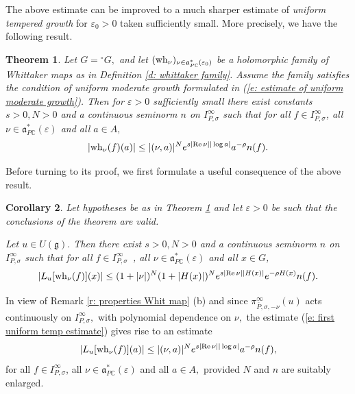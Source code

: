 \documentclass[12pt,a4paper]{article}
\newtheorem{Thm}{Theorem}
\newtheorem{Cor}[Thm]{Corollary}
\newenvironment{thm}[0]{\begin{Thm}\noindent}%
{\end{Thm}}
\newenvironment{cor}[0]{\begin{Cor}\noindent}%
{\end{Cor}}
\def\proof{\par\noindent{\it Proof.}{\ }{\ }}
\def\msy#1{{\mathbb #1}}
\def\C{{\msy C}}
\def\ge{\varepsilon}
\def\gs{\sigma}
\def\got#1{\mathfrak #1}
\def\fa{{\got a}}
\def\fg{{\got g}}
\def\Re{{\rm Re}\,}
\def\iC{{\scriptscriptstyle \C}}
\numberwithin{Thm}{section}
\numberwithin{equation}{section}
\def\faPdc{{\fa_{P\iC}^*}}
\numberwithin{equation}{section}
\def\faPdc{\fa_{P\iC}^*}
\def\snorm{n}
\def\IPgs{I_{P,\gs}^\infty}
\def\wh{{\rm wh}}
\begin{document}
The above estimate can be improved to a much sharper estimate 
of {\em uniform tempered growth} for $\ge_0 > 0$ taken sufficiently small.
More precisely, we have the following result.

\begin{thm}
\label{t: uniformly tempered estimates}
Let $G = {}^\circ G,$ and let $(\wh_\nu)_{\nu \in \faPdc(\ge_0)}$ be a holomorphic family of 
Whittaker maps as in Definition \ref{d: whittaker family}. Assume the family satisfies the condition 
of uniform moderate growth formulated in (\ref{e: estimate of uniform moderate growth}).
Then for $\ge > 0$ sufficiently small there exist constants $s > 0, N >0$ and a continuous seminorm $\snorm$ on $\IPgs$ such that for all $f \in \IPgs$, all $\nu \in \faPdc(\ge)$ and all $a \in A,$ 
\begin{equation}
\label{e: first uniform temp estimate}
|\wh_\nu(f)(a)| \leq  |(\nu,a)|^N e^{s |\Re \nu| |\log a| } a^{-\rho} \snorm(f).
\end{equation} 
\end{thm}

Before turning to its proof,  we first formulate a useful  consequence of the above result.

\begin{cor}
\label{c: uniformly tempered estimates} 
Let hypotheses be as in Theorem \ref{t: uniformly tempered estimates} and let $\ge >0$
be such that the conclusions of the theorem are valid.

Let $u \in U(\fg).$ Then there exist $s > 0, N >0$ and a continuous seminorm 
$\snorm$ on $\IPgs$ such that 
for all $f \in \IPgs$~, all  $\nu \in \faPdc(\ge)$ and all $x \in G$,
\begin{equation}
\label{e: third uniform temp estimate}
|L_u[\wh_\nu(f)](x)| \leq  (1 + |\nu|)^N (1 + | H(x)|)^N e^{s |\Re \nu| |H(x)| } e^{-\rho H(x)} \snorm(f).
\end{equation}
\end{cor}

\proof 
In view of Remark \ref{r: properties Whit map} (b) 
and since 
$\pi_{\bar P, \gs, -\nu}^{\infty}(u)$ acts continuously on $\IPgs,$ 
with polynomial dependence on $\nu,$  the estimate (\ref{e: first uniform temp estimate}) gives rise 
to an estimate
\begin{equation}
\label{e: second uniform temp estimate}
|L_u[\wh_\nu(f)](a)| \leq  |(\nu,a)|^N e^{s |\Re \nu| |\log a| } a^{-\rho} \snorm(f),
\end{equation}
for all $f \in \IPgs$,  all $\nu \in \faPdc(\ge)$ and all $a \in A,$   provided $N$ and $\snorm$ are suitably enlarged.
\end{document}
